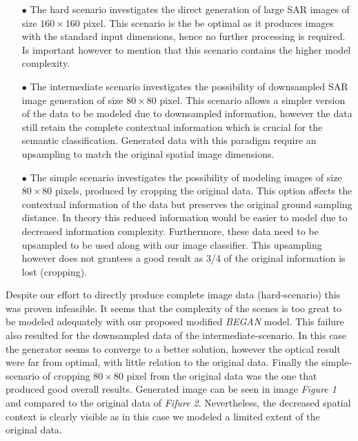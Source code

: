 \documentclass{article}
\begin{document}
\begin{itemize}

  \item[$\bullet$] The hard scenario investigates the direct generation of large SAR images of size $160 \times 160$ pixel.
  This scenario is the be optimal as it produces images with the standard input dimensions, 
  hence no further processing is required. Is important however to mention that this scenario contains the higher
  model complexity.
  
  \item[$\bullet$] The intermediate scenario investigates the possibility of downsampled SAR image generation of size $80 \times 80$ pixel.
  This scenario allows a simpler version of the data to be modeled due to downsampled information, however 
  the data still retain the complete contextual information which is crucial for the semantic classification.
  Generated data with this paradigm require an upsampling to match the original spatial image dimensions.

  \item[$\bullet$] The simple scenario investigates the possibility of modeling images of size $80 \times 80$ pixels, produced by
  cropping the original data. This option affects the contextual information of the data but
  preserves the original ground sampling distance. In theory this reduced information would be easier to model due to decreased
  information complexity. Furthermore, these data need to be upsampled to be used along with our image classifier.
  This upsampling however does not grantees a good result as 3/4 of the original information is lost (cropping). 

\end{itemize}

\noindent
Despite our effort to directly produce complete image data (hard-scenario) this was proven infeasible. It seems that the 
complexity of the scenes is too great to be modeled adequately with our proposed modified \emph{BEGAN} model.
%
This failure also resulted for the downsampled data of the intermediate-scenario. In this case the generator seems to converge to a better 
solution, however the optical result were far from optimal, with little relation to the original data.
%
Finally the simple-scenario of cropping $80 \times 80$ pixel from the original data was the one that produced good overall
results. Generated image can be seen in image \textit{Figure 1} and compared to the original data of 
\textit{Fifure 2}. Nevertheless, the decreased spatial context is clearly visible as in this case we modeled 
a limited extent of the original data.
\end{document}
